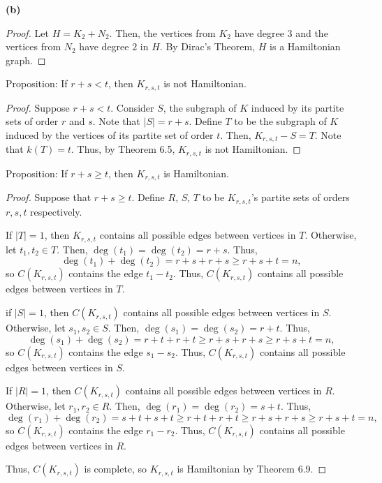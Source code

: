 \documentclass[12pt]{article}
\begin{document}
    {\bf (b)}
    \begin{proof}
	Let $H = K_2 + N_2$.
	Then, the vertices from $K_2$ have degree $3$ and the vertices from $N_2$ have degree $2$ in $H$.
	By Dirac's Theorem, $H$ is a Hamiltonian graph.
    \end{proof}


\newpage{} Proposition: If $r+s<t$, then $K_{r,s,t}$ is not Hamiltonian.
\begin{proof}
	Suppose $r + s < t$.
	Consider $S$, the subgraph of $K$ induced by its partite sets of order $r$ and $s$.
	Note that $|S| = r + s$.
	Define $T$ to be the subgraph of $K$ induced by the vertices of its partite set of order $t$.
	Then, $K_{r,s,t} - S = T$.
	Note that $k(T) = t$.
	Thus, by Theorem 6.5, $K_{r,s,t}$ is not Hamiltonian.
\end{proof}

\newpage{} Proposition: If $r+s \geq t$, then $K_{r,s,t}$ is Hamiltonian.
\begin{proof}
	Suppose that $r+s \geq t$.
	Define $R$, $S$, $T$ to be $K_{r,s,t}$'s partite sets of orders $r,s,t$ respectively.
	
	If $|T| = 1$, then $K_{r,s,t}$ contains all possible edges between vertices in $T$.
	Otherwise, let $t_1,t_2 \in T$.
	Then, $\deg(t_1) = \deg(t_2) = r + s$.
	Thus, $$\deg(t_1) + \deg(t_2) = r + s + r + s \geq r + s + t = n,$$ so $C(K_{r,s,t})$ contains the edge $t_1-t_2$.
	Thus, $C(K_{r,s,t})$ contains all possible edges between vertices in $T$.

	if $|S| = 1$, then $C(K_{r,s,t})$ contains all possible edges between vertices in $S$.
	Otherwise, let $s_1, s_2 \in S$. 
	Then, $\deg(s_1) = \deg(s_2) = r + t$.
	Thus, $$\deg(s_1) + \deg(s_2) = r + t + r + t \geq r + s + r + s \geq r + s + t = n,$$ so $C(K_{r,s,t})$ contains the edge $s_1-s_2$.
	Thus, $C(K_{r,s,t})$ contains all possible edges between vertices in $S$.

	If $|R| = 1$, then $C(K_{r,s,t})$ contains all possible edges between vertices in $R$.
	Otherwise, let $r_1, r_2 \in R$.
	Then, $\deg(r_1) = \deg(r_2) = s + t$.
	Thus, $$\deg(r_1) + \deg(r_2) = s + t + s + t \geq r + t + r + t \geq r + s + r + s \geq r + s + t = n,$$ so $C(K_{r,s,t})$ contains the edge $r_1-r_2$.
	Thus, $C(K_{r,s,t})$ contains all possible edges between vertices in $R$.

	Thus, $C(K_{r,s,t})$ is complete, so $K_{r,s,t}$ is Hamiltonian by Theorem 6.9.

\end{proof}
\end{document}
